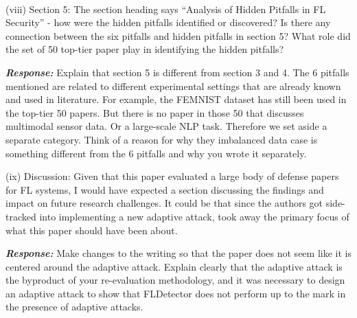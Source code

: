 \

(viii) Section 5: The section heading says “Analysis of Hidden Pitfalls in FL Security” - how were the hidden pitfalls identified or discovered? Is there any connection between the six pitfalls and hidden pitfalls in section 5? What role did the set of 50 top-tier paper play in identifying the hidden pitfalls?

\textbf{\textit{Response:}}
Explain that section 5 is different from section 3 and 4. The 6 pitfalls mentioned are related to different experimental settings that are already known and used in literature. For example, the FEMNIST dataset has still been used in the top-tier 50 papers. But there is no paper in those 50 that discusses multimodal sensor data. Or a large-scale NLP task. Therefore we set aside a separate category.
Think of a reason for why they imbalanced data case is something different from the 6 pitfalls and why you wrote it separately.

(ix) Discussion: Given that this paper evaluated a large body of defense papers for FL systems, I would have expected a section discussing the findings and impact on future research challenges. It could be that since the authors got side-tracked into implementing a new adaptive attack, took away the primary focus of what this paper should have been about.

\textbf{\textit{Response:}}
Make changes to the writing so that the paper does not seem like it is centered around the adaptive attack. Explain clearly that the adaptive attack is the byproduct of your re-evaluation methodology, and it was necessary to design an adaptive attack to show that FLDetector does not perform up to the mark in the presence of adaptive attacks.